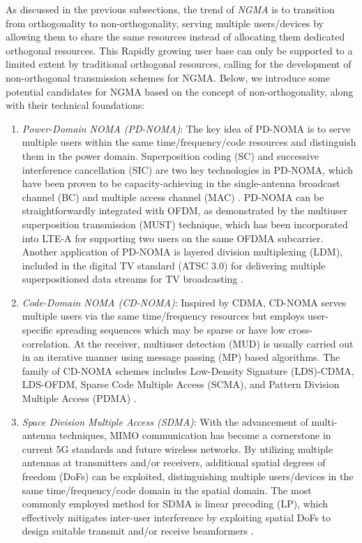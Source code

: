 As discussed in the previous subsections, the trend of \textit{NGMA} is to transition from orthogonality to non-orthogonality, serving multiple users/devices by allowing them to share the same resources instead of allocating them dedicated orthogonal resources. This Rapidly growing user base can only be supported to a limited extent by traditional orthogonal resources, calling for the development of non-orthogonal transmission schemes for NGMA. Below, we introduce some potential candidates for NGMA based on the concept of non-orthogonality, along with their technical foundations:

\begin{enumerate}
    \item \textit{Power-Domain NOMA (PD-NOMA)}: The key idea of PD-NOMA is to serve multiple users within the same time/frequency/code resources and distinguish them in the power domain. Superposition coding (SC) and successive interference cancellation (SIC) are two key technologies in PD-NOMA, which have been proven to be capacity-achieving in the single-antenna broadcast channel (BC) and multiple access channel (MAC) \cite{noma1}. PD-NOMA can be straightforwardly integrated with OFDM, as demonstrated by the multiuser superposition transmission (MUST) technique, which has been incorporated into LTE-A for supporting two users on the same OFDMA subcarrier. Another application of PD-NOMA is layered division multiplexing (LDM), included in the digital TV standard (ATSC 3.0) for delivering multiple superpositioned data streams for TV broadcasting \cite{noma3}.
    
    \item \textit{Code-Domain NOMA (CD-NOMA)}: Inspired by CDMA, CD-NOMA serves multiple users via the same time/frequency resources but employs user-specific spreading sequences which may be sparse or have low cross-correlation. At the receiver, multiuser detection (MUD) is usually carried out in an iterative manner using message passing (MP) based algorithms. The family of CD-NOMA schemes includes Low-Density Signature (LDS)-CDMA, LDS-OFDM, Sparse Code Multiple Access (SCMA), and Pattern Division Multiple Access (PDMA) \cite{liu2020noma}.
    
    \item \textit{Space Division Multiple Access (SDMA)}: With the advancement of multi-antenna techniques, MIMO communication has become a cornerstone in current 5G standards and future wireless networks. By utilizing multiple antennas at transmitters and/or receivers, additional spatial degrees of freedom (DoFs) can be exploited, distinguishing multiple users/devices in the same time/frequency/code domain in the spatial domain. The most commonly employed method for SDMA is linear precoding (LP), which effectively mitigates inter-user interference by exploiting spatial DoFs to design suitable transmit and/or receive beamformers \cite{noma2}.
    

\end{enumerate}
